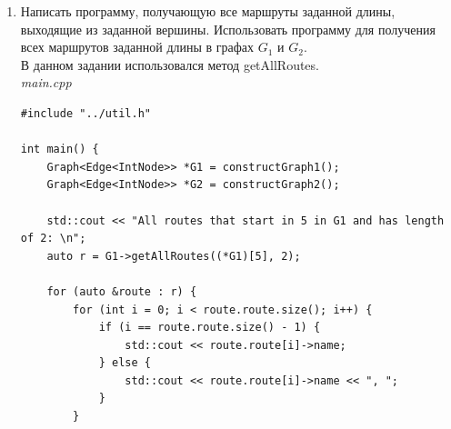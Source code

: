 \documentclass[a4paper,14pt]{extarticle}
\begin{document}
\begin{enumerate}[1.]
\begin{verbatim}
Testing route {1, 4, 3, 2, 1} for graph G1:

Is route
Is chain
Is not simple chain
Is cycle
Is simple cycle
Testing route {1, 2, 4, 3, 2, 1} for graph G1:

Is not route
Is not chain
Is not simple chain
Is not cycle
Is not simple cycle

Testing route {2, 4, 1, 7, 6, 1, 2} for graph G1:

Is not route
Is not chain
Is not simple chain
Is not cycle
Is not simple cycle

Testing route {2, 3, 4, 1, 7, 6} for graph G2:

Is route
Is chain
Is simple chain
Is not cycle
Is not simple cycle

Testing route {4, 1, 6, 7, 1, 2} for graph G2:

Is route
Is chain
Is not simple chain
Is not cycle
Is not simple cycle

Testing route {1, 4, 3, 2, 1} for graph G2:

Is route
Is chain
Is not simple chain
Is cycle
Is simple cycle
Testing route {1, 2, 4, 3, 2, 1} for graph G2:

Is route
Is not chain
Is not simple chain
Is not cycle
Is not simple cycle

Testing route {2, 4, 1, 7, 6, 1, 2} for graph G2:

Is route
Is chain
Is not simple chain
Is cycle
Is not simple cycle
        \end{verbatim}
        Результат выполнения программы совпали с ручными вычислениями.


        \item Написать программу, получающую все маршруты заданной 
        длины, выходящие из заданной вершины. Использовать программу для
        получения всех маршрутов заданной длины в графах $G_1$ и $G_2$.\\
        В данном задании использовался метод getAllRoutes.\\
        \textit{main.cpp}
        \begin{verbatim}
#include "../util.h"

int main() {
    Graph<Edge<IntNode>> *G1 = constructGraph1();
    Graph<Edge<IntNode>> *G2 = constructGraph2();

    std::cout << "All routes that start in 5 in G1 and has length of 2: \n";
    auto r = G1->getAllRoutes((*G1)[5], 2);

    for (auto &route : r) {
        for (int i = 0; i < route.route.size(); i++) {
            if (i == route.route.size() - 1) {
                std::cout << route.route[i]->name;
            } else {
                std::cout << route.route[i]->name << ", ";
            }
        }


\end{verbatim}
\end{enumerate}
\end{document}
